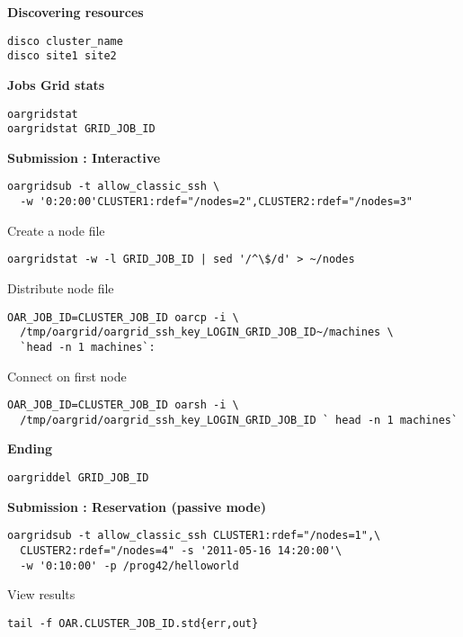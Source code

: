 \textbf{Discovering resources}
\begin{lstlisting}
disco cluster_name
disco site1 site2
\end{lstlisting}
\makeruleinbox

\textbf{Jobs Grid stats}
\begin{lstlisting}
oargridstat
oargridstat GRID_JOB_ID
\end{lstlisting}
\makeruleinbox

\textbf{Submission : Interactive}
\begin{lstlisting}
oargridsub -t allow_classic_ssh \
  -w '0:20:00'CLUSTER1:rdef="/nodes=2",CLUSTER2:rdef="/nodes=3"
\end{lstlisting}

Create a node file
\begin{lstlisting}
oargridstat -w -l GRID_JOB_ID | sed '/^\$/d' > ~/nodes
\end{lstlisting}

Distribute node file
\begin{lstlisting}
OAR_JOB_ID=CLUSTER_JOB_ID oarcp -i \
  /tmp/oargrid/oargrid_ssh_key_LOGIN_GRID_JOB_ID~/machines \
  `head -n 1 machines`:
\end{lstlisting}

Connect on first node
\begin{lstlisting}
OAR_JOB_ID=CLUSTER_JOB_ID oarsh -i \
  /tmp/oargrid/oargrid_ssh_key_LOGIN_GRID_JOB_ID ` head -n 1 machines`
\end{lstlisting}
\makeruleinbox

\textbf{Ending}
\begin{lstlisting}
oargriddel GRID_JOB_ID
\end{lstlisting}

\textbf{Submission : Reservation (passive mode)}
\begin{lstlisting}
oargridsub -t allow_classic_ssh CLUSTER1:rdef="/nodes=1",\
  CLUSTER2:rdef="/nodes=4" -s '2011-05-16 14:20:00'\
  -w '0:10:00' -p /prog42/helloworld
\end{lstlisting}

View results
\begin{lstlisting}
tail -f OAR.CLUSTER_JOB_ID.std{err,out}
\end{lstlisting}\vspace{-1.5em}%